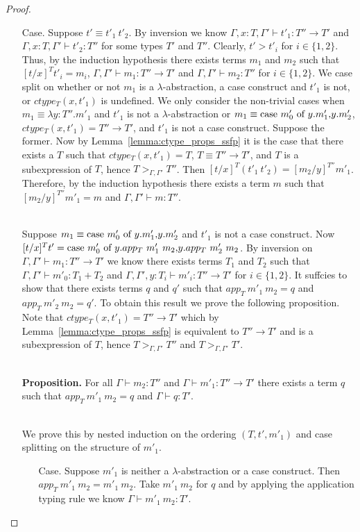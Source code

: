 \begin{proof}
\begin{itemize}
\item[Case.] Suppose $t' \equiv t'_1\ t'_2$.  By inversion we know
  $\Gamma, x:T, \Gamma' \vdash t'_1 : T'' \to T'$ and
  $\Gamma, x:T, \Gamma' \vdash t'_2 : T''$ for some types $T'$ and $T''$.
  Clearly, $t' > t'_i$ for $i \in \{1,2\}$.  Thus, by the induction hypothesis
  there exists terms $m_1$ and $m_2$ such that $[t/x]^T t'_i = m_i$,
  $\Gamma, \Gamma' \vdash m_1 : T'' \to T'$ and
  $\Gamma, \Gamma' \vdash m_2 : T''$ for
  $i \in \{1,2\}$.  We case split on whether or not $m_1$ is a $\lambda$-abstraction,
  a case construct and $t'_1$ is not, or $ctype_T(x,t'_1)$ is undefined.  
  We only consider the non-trivial cases when 
  $m_1 \equiv \lambda y:T''.m'_1$ and $t'_1$ is not a $\lambda$-abstraction or $m_1 \equiv \mbox{case}\ m'_0\ \text{of}\ y\text{.}m'_1\text{,}y\text{.}m'_2$,
  $ctype_T(x,t'_1) = T'' \to T'$, and $t'_1$ is not a case construct.  Suppose the former.  
  Now by Lemma~\ref{lemma:ctype_props_ssfp} it is the case that 
  there exists a $T$ such that $ctype_T(x,t'_1) = T$, 
  $T \equiv T'' \to T'$, and $T$ is a subexpression of $T$, hence
  $T >_{\Gamma,\Gamma'} T''$.
  Then $[t/x]^T (t'_1\ t'_2) = [m_2/y]^{T''} m'_1$.  
  Therefore, by the induction hypothesis there exists a 
  term $m$ such that $[m_2/y]^{T''} m'_1 = m$ and $\Gamma,\Gamma' \vdash m:T''$.
  
  \ \\
  Suppose $m_1 \equiv \mbox{case}\ m'_0\ \text{of}\ y\text{.}m'_1\text{,}y\text{.}m'_2$ and $t'_1$ is not a case construct.
  Now $[t/x]^T t' = \mbox{case}\ m'_0\ \text{of}\ y\text{.}app_T\ m'_1\ m_2\text{,}y\text{.}app_T\ m'_2\ m_2$.  By inversion on
  $\Gamma,\Gamma' \vdash m_1 : T'' \to T'$ we know there exists terms $T_1$ and $T_2$ such that
  $\Gamma,\Gamma' \vdash m'_0:T_1+T_2$ and
  $\Gamma,\Gamma',y:T_i \vdash m'_i:T'' \to T'$
  for $i \in \{1,2\}$.  It suffcies to show that
  there exists terms $q$ and $q'$ such that $app_T\ m'_1\ m_2 = q$ and $app_T\ m'_2\ m_2 = q'$.  To obtain
  this result we prove the following proposition.  Note that $ctype_T(x,t'_1) = T'' \to T'$ which
  by Lemma~\ref{lemma:ctype_props_ssfp} is equivalent to $T'' \to T'$ and is 
  a subexpression of $T$, hence $T >_{\Gamma,\Gamma'} T''$ and $T >_{\Gamma,\Gamma'} T'$.

  \ \\
  {\bf Proposition.}  For all 
  $\Gamma \vdash m_2 : T''$ and $\Gamma \vdash m'_1:T'' \to T'$
  there exists a term $q$ such that $app_T\ m'_1\ m_2 = q$ and $\Gamma \vdash q:T'$.
  
  \ \\
  We prove this by nested induction on the ordering $(T, t', m'_1)$ and case splitting on 
  the structure of $m'_1$.
  \begin{itemize}
  \item[Case.] Suppose $m'_1$ is neither a $\lambda$-abstraction or a case construct.  Then\\
    $app_T\  m'_1\ m_2 = m'_1\ m_2$.  Take $m'_1\ m_2$ for $q$ and by applying the application typing rule
    we know $\Gamma \vdash m'_1\ m_2:T'$.
    

\end{itemize}
\end{itemize}
\end{proof}

